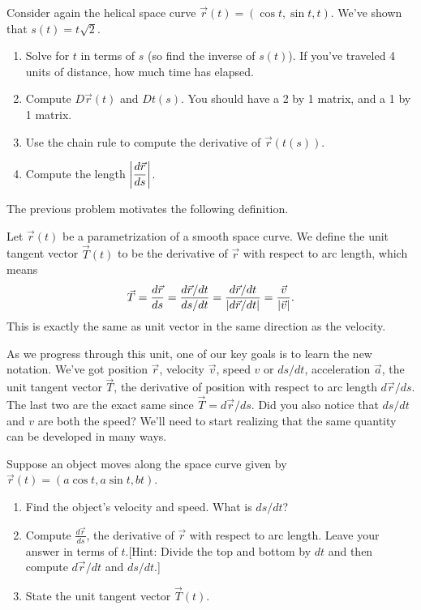 \begin{problem}
%
Consider again the helical space curve $\vec r(t)=(\cos t, \sin t, t)$.  We've shown that $s(t) = t\sqrt{2}$. 
\begin{enumerate}
 \item Solve for $t$ in terms of $s$ (so find the inverse of $s(t)$). If you've traveled 4 units of distance, how much time has elapsed.   
 \item Compute $D\vec r(t)$ and $Dt(s)$.  You should have a 2 by 1 matrix, and a 1 by 1 matrix. 
 \item Use the chain rule to compute the derivative of $\vec r(t(s))$.
 \item Compute the length $\left|\displaystyle\frac{d\vec r}{ds}\right|$.
\end{enumerate}
\end{problem}

The previous problem motivates the following definition.

\begin{definition}\label{def unit tangent vector}
 Let $\vec r(t)$ be a parametrization of a smooth space curve. We define the unit tangent vector $\vec T(t)$ to be the derivative of $\vec r$ with respect to arc length, which means
$$\vec T = \displaystyle\frac{d\vec r}{ds}=\displaystyle\frac{d\vec r/dt}{ds/dt} = \frac{d\vec r/dt}{|d \vec r/dt|} = \frac{\vec v}{|\vec v|}.$$
This is exactly the same as unit vector in the same direction as the velocity.
\end{definition}

As we progress through this unit, one of our key goals is to learn the new notation.  We've got position $\vec r$,  velocity $\vec v$, speed $v$ or $ds/dt$, acceleration $\vec a$, the unit tangent vector $\vec T$, the derivative of position with respect to arc length $d\vec r/ds$.  The last two are the exact same since $\vec T = d\vec r/ds$. Did you also notice that $ds/dt$ and $v$ are both the speed?  We'll need to start realizing that the same quantity can be developed in many ways. 

\begin{problem}
%
 Suppose an object moves along the space curve given by  $\vec r(t)=(a\cos t,a\sin t,b t)$. 
\begin{enumerate}
 \item Find the object's velocity and speed. What is $ds/dt$?
 \item Compute $\frac{d\vec r}{ds}$, the derivative of $\vec r$ with respect to arc length. Leave your answer in terms of $t$.[Hint: Divide the top and bottom by $dt$ and then compute $d\vec r/dt$ and $ds/dt$.]  
 \item State the unit tangent vector $\vec T(t)$.
\end{enumerate}
\end{problem}

